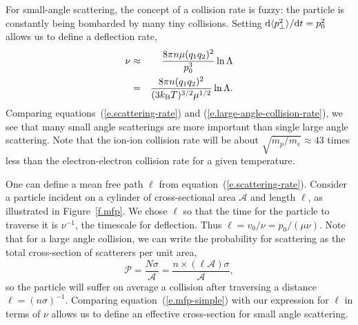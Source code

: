 For small-angle scattering, the concept of a collision rate is fuzzy: the particle is constantly being bombarded by many tiny collisions.  Setting $\mathrm{d} \langle p_{\bot}^{2}\rangle/\mathrm{d} t = p_{0}^{2}$ allows us to define a deflection rate,
\begin{eqnarray}\label{e.scattering-rate}
\nu &\approx& \frac{8\pi n \mu (q_{1}q_{2})^{2}}{p_{0}^{3}} \ln\Lambda\\
 &=& \frac{8\pi n (q_{1}q_{2})^{2}}{(3k_\mathrm{B} T)^{3/2}\mu^{1/2}}\ln\Lambda.
\end{eqnarray}
Comparing equations~(\ref{e.scattering-rate}) and (\ref{e.large-angle-collision-rate}), we see that many small angle scatterings are more important than single large angle scattering. Note that the ion-ion collision rate will be about $\sqrt{m_{p}/m_{e}} \approx 43$ times less than the electron-electron collision rate for a given temperature.

One can define a mean free path $\ell$ from equation~(\ref{e.scattering-rate}). Consider a particle incident on a cylinder of cross-sectional area $\mathcal{A}$ and length $\ell$, as illustrated in Figure~\ref{f.mfp}. We chose $\ell$ so that the time for the particle to traverse it is $\nu^{-1}$, the timescale for deflection.  Thus $\ell = v_{0}/\nu = p_{0}/(\mu\nu)$. Note that for a large angle collision, we can write the probability for scattering as the total cross-section of scatterers per unit area,
\begin{equation}\label{e.mfp-simple}
\mathcal{P} = \frac{N\sigma}{\mathcal{A}} = \frac{n\times(\ell\mathcal{A})\sigma}{\mathcal{A}},
\end{equation}
so the particle will suffer on average a collision after traversing a distance $\ell = (n\sigma)^{-1}$. Comparing equation~(\ref{e.mfp-simple}) with our expression for $\ell$ in terms of $\nu$ allows us to define an effective cross-section for small angle scattering.

